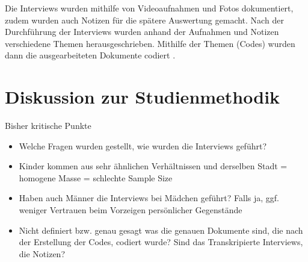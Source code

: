 \documentclass{hsflensburg}
\begin{document}
	Die Interviews wurden mithilfe von Videoaufnahmen und Fotos dokumentiert, zudem
	wurden auch Notizen für die spätere Auswertung gemacht. Nach der Durchführung
	der Interviews wurden anhand der Aufnahmen und Notizen verschiedene Themen
	herausgeschrieben. Mithilfe der Themen (Codes) wurden dann die ausgearbeiteten
	Dokumente codiert \cite{odom2011teenagers}.  

	\section{Diskussion zur Studienmethodik}

	Bisher kritische Punkte

	\begin{itemize}
	\item Welche Fragen wurden gestellt, wie wurden die Interviews geführt?
	\item Kinder kommen aus sehr ähnlichen Verhältnissen und derselben Stadt = homogene Masse = schlechte Sample Size
	\item Haben auch Männer die Interviews bei Mädchen geführt? Falls ja, ggf. weniger Vertrauen beim Vorzeigen persönlicher Gegenstände
	\item Nicht definiert bzw. genau gesagt was die genauen Dokumente sind, die nach der Erstellung der Codes, codiert wurde? Sind
		das Transkripierte Interviews, die Notizen?
	\end{itemize}
	

	\clearpage
	\nocite{*}	
	
	
\end{document}
